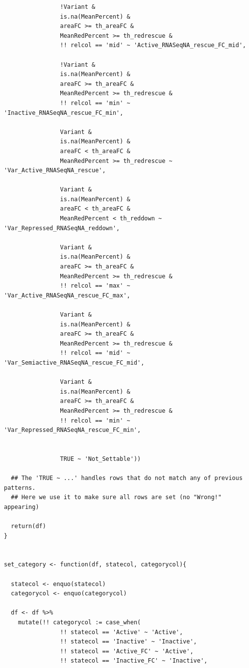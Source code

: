 \documentclass[11pt]{article}
\begin{document}
\begin{verbatim}
                !Variant &
                is.na(MeanPercent) &
                areaFC >= th_areaFC &
                MeanRedPercent >= th_redrescue &
                !! relcol == 'mid' ~ 'Active_RNASeqNA_rescue_FC_mid',

                !Variant &
                is.na(MeanPercent) &
                areaFC >= th_areaFC &
                MeanRedPercent >= th_redrescue &
                !! relcol == 'min' ~ 'Inactive_RNASeqNA_rescue_FC_min',

                Variant &
                is.na(MeanPercent) &
                areaFC < th_areaFC &
                MeanRedPercent >= th_redrescue ~ 'Var_Active_RNASeqNA_rescue',

                Variant &
                is.na(MeanPercent) &
                areaFC < th_areaFC &
                MeanRedPercent < th_reddown ~ 'Var_Repressed_RNASeqNA_reddown',

                Variant &
                is.na(MeanPercent) &
                areaFC >= th_areaFC &
                MeanRedPercent >= th_redrescue &
                !! relcol == 'max' ~ 'Var_Active_RNASeqNA_rescue_FC_max',

                Variant &
                is.na(MeanPercent) &
                areaFC >= th_areaFC &
                MeanRedPercent >= th_redrescue &
                !! relcol == 'mid' ~ 'Var_Semiactive_RNASeqNA_rescue_FC_mid',

                Variant &
                is.na(MeanPercent) &
                areaFC >= th_areaFC &
                MeanRedPercent >= th_redrescue &
                !! relcol == 'min' ~ 'Var_Repressed_RNASeqNA_rescue_FC_min',


                TRUE ~ 'Not_Settable'))

  ## The 'TRUE ~ ...' handles rows that do not match any of previous patterns.
  ## Here we use it to make sure all rows are set (no "Wrong!" appearing)

  return(df)
}


set_category <- function(df, statecol, categorycol){

  statecol <- enquo(statecol)
  categorycol <- enquo(categorycol)

  df <- df %>%
    mutate(!! categorycol := case_when(
                !! statecol == 'Active' ~ 'Active',
                !! statecol == 'Inactive' ~ 'Inactive',
                !! statecol == 'Active_FC' ~ 'Active',
                !! statecol == 'Inactive_FC' ~ 'Inactive',


\end{verbatim}
\end{document}
